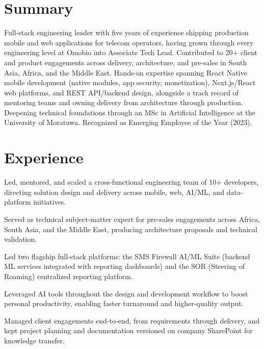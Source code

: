 \documentclass[10.5pt]{article}
\begin{document}

\section*{Summary}
Full-stack engineering leader with five years of experience shipping production mobile and web applications for telecom operators, having grown through every engineering level at Omobio into Associate Tech Lead. Contributed to 20+ client and product engagements across delivery, architecture, and pre-sales in South Asia, Africa, and the Middle East. Hands-on expertise spanning React Native mobile development (native modules, app security, monetization), Next.js/React web platforms, and REST API/backend design, alongside a track record of mentoring teams and owning delivery from architecture through production. Deepening technical foundations through an MSc in Artificial Intelligence at the University of Moratuwa. Recognized as Emerging Employee of the Year (2023).

\section*{Experience}

\begin{cvitems}
  \item Led, mentored, and scaled a cross-functional engineering team of 10+ developers, directing solution design and delivery across mobile, web, AI/ML, and data-platform initiatives.
  \item Served as technical subject-matter expert for pre-sales engagements across Africa, South Asia, and the Middle East, producing architecture proposals and technical validation.
  \item Led two flagship full-stack platforms: the SMS Firewall AI/ML Suite (backend ML services integrated with reporting dashboards) and the SOR (Steering of Roaming) centralized reporting platform.
  \item Leveraged AI tools throughout the design and development workflow to boost personal productivity, enabling faster turnaround and higher-quality output.
  \item Managed client engagements end-to-end, from requirements through delivery, and kept project planning and documentation versioned on company SharePoint for knowledge transfer.
\end{cvitems}
\end{document}
